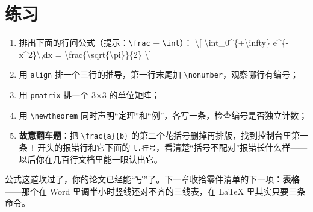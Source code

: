 \section*{练习}

\begin{enumerate}
\setlength{\itemsep}{2pt}
\item 排出下面的行间公式（提示：\texttt{\textbackslash{}frac} + \texttt{\textbackslash{}int}）： \textbackslash{}[ \textbackslash{}int\_0\textasciicircum{}\{+\textbackslash{}infty\} e\textasciicircum{}\{-x\textasciicircum{}2\}\textbackslash{},dx = \textbackslash{}frac\{\textbackslash{}sqrt\{\textbackslash{}pi\}\}\{2\} \textbackslash{}]
\item 用 \texttt{align} 排一个三行的推导，第一行末尾加 \texttt{\textbackslash{}nonumber}，观察哪行有编号；
\item 用 \texttt{pmatrix} 排一个 3\ensuremath{\times}3 的单位矩阵；
\item 用 \texttt{\textbackslash{}newtheorem} 同时声明“定理”和“例”，各写一条，检查编号是否独立计数；
\item \textbf{故意翻车题}：把 \texttt{\textbackslash{}frac\{a\}\{b\}} 的第二个花括号删掉再排版，找到控制台里第一条 \texttt{!} 开头的报错行和它下面的 \texttt{l.行号}，看清楚“括号不配对”报错长什么样——以后你在几百行文档里能一眼认出它。
\end{enumerate}

公式这道坎过了，你的论文已经能“写”了。下一章收拾零件清单的下一项：\textbf{表格}——那个在 Word 里调半小时竖线还对不齐的三线表，在 LaTeX 里其实只要三条命令。
